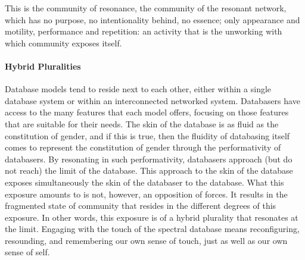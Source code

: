 This is the community of resonance, the community of the resonant network, which has no purpose, no intentionality behind, no essence; only appearance and motility, performance and repetition: an activity that is 
the unworking with which community exposes itself. 

\paragraph{Hybrid Pluralities}
Database models tend to reside next to each other, either within a single database system or within an interconnected networked system. Databasers have access to the many features that each model offers, focusing on those features that are suitable for their needs.  The skin of the database is as fluid as the constitution of gender, and if this is true, then the fluidity of databasing itself comes to represent the constitution of gender through the performativity of databasers. By resonating in such performativity, databasers approach (but do not reach) the limit of the database. This approach to the skin of the database exposes simultaneously 
the skin of the databaser to the database. 
%
What this exposure amounts to is not, however, an opposition of forces. It results in the fragmented state of community that resides in the different degrees of this exposure. In other words, this exposure is of a hybrid plurality that resonates at the limit. Engaging with the touch of the spectral database means reconfiguring, resounding, and remembering our own sense of touch, just as well as our own sense of self.